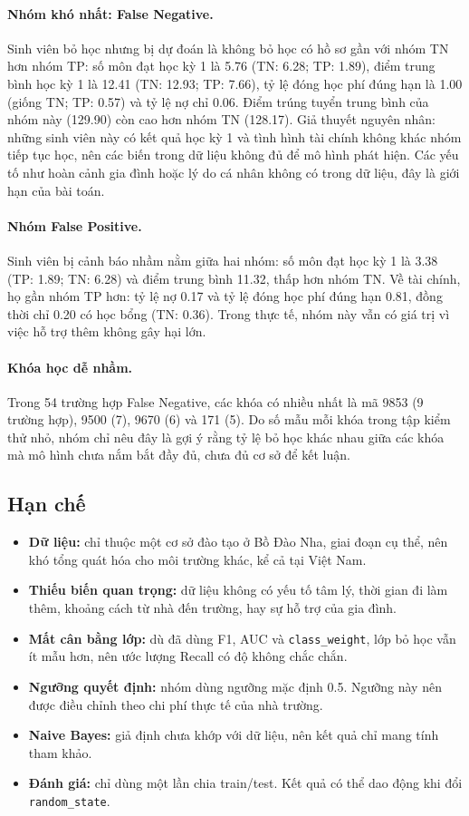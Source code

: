 \documentclass[12pt,a4paper]{article}
\begin{document}
\paragraph{Nhóm khó nhất: False Negative.} Sinh viên bỏ học nhưng bị dự đoán là không bỏ học có hồ sơ gần với nhóm TN hơn nhóm TP: số môn đạt học kỳ 1 là 5.76 (TN: 6.28; TP: 1.89), điểm trung bình học kỳ 1 là 12.41 (TN: 12.93; TP: 7.66), tỷ lệ đóng học phí đúng hạn là 1.00 (giống TN; TP: 0.57) và tỷ lệ nợ chỉ 0.06. Điểm trúng tuyển trung bình của nhóm này (129.90) còn cao hơn nhóm TN (128.17). Giả thuyết nguyên nhân: những sinh viên này có kết quả học kỳ 1 và tình hình tài chính không khác nhóm tiếp tục học, nên các biến trong dữ liệu không đủ để mô hình phát hiện. Các yếu tố như hoàn cảnh gia đình hoặc lý do cá nhân không có trong dữ liệu, đây là giới hạn của bài toán.

\paragraph{Nhóm False Positive.} Sinh viên bị cảnh báo nhầm nằm giữa hai nhóm: số môn đạt học kỳ 1 là 3.38 (TP: 1.89; TN: 6.28) và điểm trung bình 11.32, thấp hơn nhóm TN. Về tài chính, họ gần nhóm TP hơn: tỷ lệ nợ 0.17 và tỷ lệ đóng học phí đúng hạn 0.81, đồng thời chỉ 0.20 có học bổng (TN: 0.36). Trong thực tế, nhóm này vẫn có giá trị vì việc hỗ trợ thêm không gây hại lớn.

\paragraph{Khóa học dễ nhầm.} Trong 54 trường hợp False Negative, các khóa có nhiều nhất là mã 9853 (9 trường hợp), 9500 (7), 9670 (6) và 171 (5). Do số mẫu mỗi khóa trong tập kiểm thử nhỏ, nhóm chỉ nêu đây là gợi ý rằng tỷ lệ bỏ học khác nhau giữa các khóa mà mô hình chưa nắm bắt đầy đủ, chưa đủ cơ sở để kết luận.

\subsection{Hạn chế}
\begin{itemize}
  \item \textbf{Dữ liệu:} chỉ thuộc một cơ sở đào tạo ở Bồ Đào Nha, giai đoạn cụ thể, nên khó tổng quát hóa cho môi trường khác, kể cả tại Việt Nam.
  \item \textbf{Thiếu biến quan trọng:} dữ liệu không có yếu tố tâm lý, thời gian đi làm thêm, khoảng cách từ nhà đến trường, hay sự hỗ trợ của gia đình.
  \item \textbf{Mất cân bằng lớp:} dù đã dùng F1, AUC và \texttt{class\_weight}, lớp bỏ học vẫn ít mẫu hơn, nên ước lượng Recall có độ không chắc chắn.
  \item \textbf{Ngưỡng quyết định:} nhóm dùng ngưỡng mặc định 0.5. Ngưỡng này nên được điều chỉnh theo chi phí thực tế của nhà trường.
  \item \textbf{Naive Bayes:} giả định chưa khớp với dữ liệu, nên kết quả chỉ mang tính tham khảo.
  \item \textbf{Đánh giá:} chỉ dùng một lần chia train/test. Kết quả có thể dao động khi đổi \texttt{random\_state}.
\end{itemize}
\end{document}
